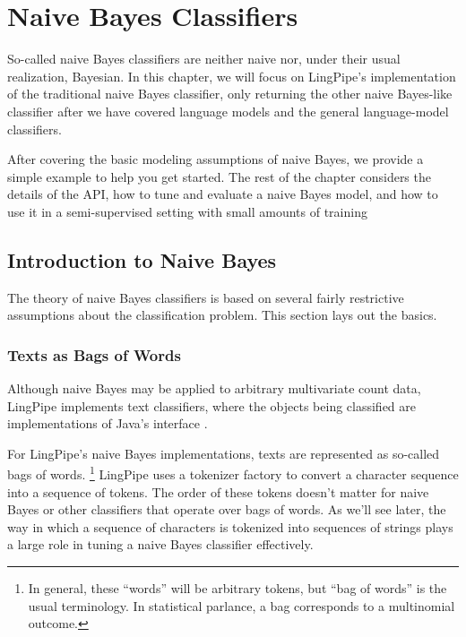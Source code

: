 \chapter{Naive Bayes Classifiers}\label{chap:naive-bayes}

So-called naive Bayes classifiers are neither naive nor, under their
usual realization, Bayesian.  In this chapter, we will focus on
LingPipe's implementation of the traditional naive Bayes classifier,
only returning the other naive Bayes-like classifier after we have
covered language models and the general language-model classifiers.

After covering the basic modeling assumptions of naive Bayes, we
provide a simple example to help you get started.  The rest of the
chapter considers the details of the API, how to tune and evaluate a
naive Bayes model, and how to use it in a semi-supervised setting with
small amounts of training



\section{Introduction to Naive Bayes}

The theory of naive Bayes classifiers is based on several fairly
restrictive assumptions about the classification problem.  This
section lays out the basics.

\subsection{Texts as Bags of Words}

Although naive Bayes may be applied to arbitrary multivariate count
data, LingPipe implements text classifiers, where the objects being
classified are implementations of Java's  interface
.

For LingPipe's naive Bayes implementations, texts are represented as
so-called bags of words.%
%
\footnote{In general, these ``words'' will be arbitrary tokens, but
  ``bag of words'' is the usual terminology.  In statistical parlance,
  a bag corresponds to a multinomial outcome.}
%
LingPipe uses a tokenizer factory to convert a character sequence into
a sequence of tokens.  The order of these tokens doesn't matter for
naive Bayes or other classifiers that operate over bags of words.  As
we'll see later, the way in which a sequence of characters is
tokenized into sequences of strings plays a large role in
tuning a naive Bayes classifier effectively.

